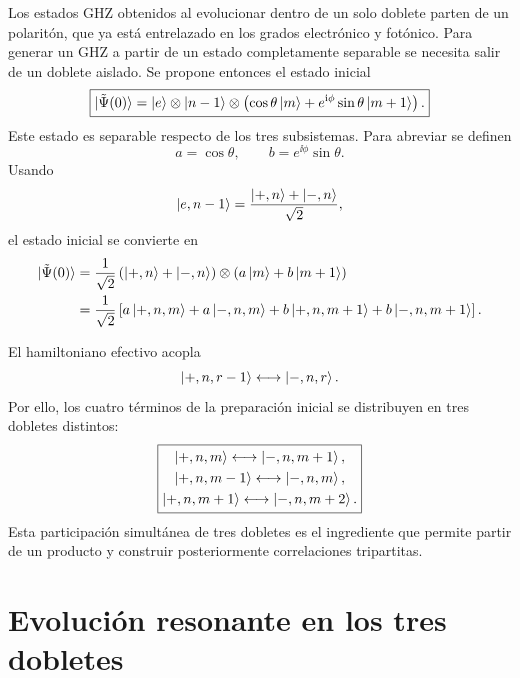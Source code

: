 Los estados GHZ obtenidos al evolucionar dentro de un solo doblete parten de
un polarit\'on, que ya est\'a entrelazado en los grados electr\'onico y
fot\'onico. Para generar un GHZ a partir de un estado completamente separable
se necesita salir de un doblete aislado. Se propone entonces el estado inicial
\begin{equation}
  \boxed{
  \ket{\tilde\Psi(0)}
  =
  \ket e\otimes\ket{n-1}
  \otimes
  \left(
  \cos\theta\ket m
  +e^{\mathrm{i}\phi}\sin\theta\ket{m+1}
  \right).
  }
\end{equation}
Este estado es separable respecto de los tres subsistemas. Para abreviar se
definen
\begin{equation}
  a=\cos\theta,
  \qquad
  b=e^{\ii\phi}\sin\theta.
\end{equation}
Usando
\begin{equation}
  \ket{e,n-1}
  =
  \frac{\ket{+,n}+\ket{-,n}}{\sqrt2},
\end{equation}
el estado inicial se convierte en
\begin{equation}
\begin{aligned}
  \ket{\tilde\Psi(0)}
  &=\frac{1}{\sqrt2}
  \left(\ket{+,n}+\ket{-,n}\right)
  \otimes
  \left(a\ket m+b\ket{m+1}\right)
  \\
  &=
  \frac{1}{\sqrt2}
  \left[
  a\ket{+,n,m}
  +a\ket{-,n,m}
  +b\ket{+,n,m+1}
  +b\ket{-,n,m+1}
  \right].
\end{aligned}
\end{equation}

El hamiltoniano efectivo acopla
\begin{equation}
  \ket{+,n,r-1}
  \longleftrightarrow
  \ket{-,n,r}.
\end{equation}
Por ello, los cuatro t\'erminos de la preparaci\'on inicial se distribuyen en
tres dobletes distintos:
\begin{equation}
  \boxed{
  \begin{gathered}
  \ket{+,n,m}\longleftrightarrow\ket{-,n,m+1},
  \\
  \ket{+,n,m-1}\longleftrightarrow\ket{-,n,m},
  \\
  \ket{+,n,m+1}\longleftrightarrow\ket{-,n,m+2}.
  \end{gathered}
  }
\end{equation}
Esta participaci\'on simult\'anea de tres dobletes es el ingrediente que permite
partir de un producto y construir posteriormente correlaciones tripartitas.

\section{Evoluci\'on resonante en los tres dobletes}

